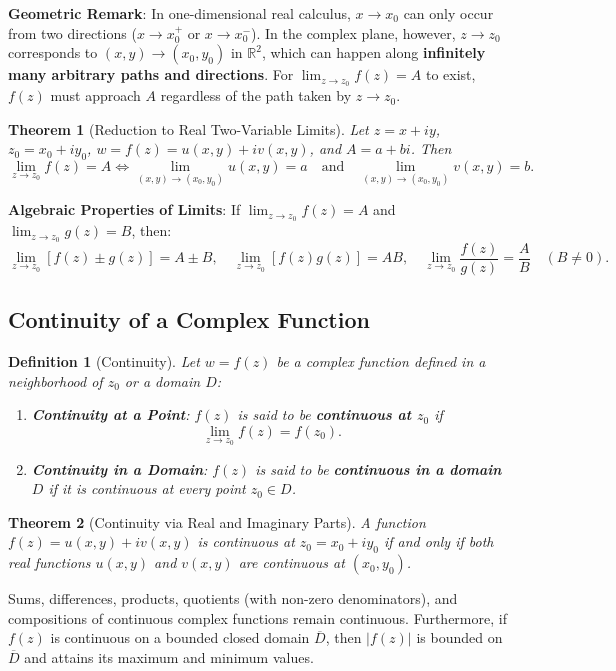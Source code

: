 \documentclass[11pt,a4paper]{article}
\theoremstyle{breakdef}
\newtheorem{definition}{Definition}
\theoremstyle{breakthm}
\newtheorem{theorem}{Theorem}
\begin{document}
\textbf{Geometric Remark}: In one-dimensional real calculus, $x \to x_0$ can only occur from two directions ($x \to x_0^+$ or $x \to x_0^-$). In the complex plane, however, $z \to z_0$ corresponds to $(x, y) \to (x_0, y_0)$ in $\mathbb{R}^2$, which can happen along \textbf{infinitely many arbitrary paths and directions}. For $\lim_{z \to z_0} f(z) = A$ to exist, $f(z)$ must approach $A$ regardless of the path taken by $z \to z_0$.

\begin{theorem}[Reduction to Real Two-Variable Limits]
Let $z = x + iy$, $z_0 = x_0 + iy_0$, $w = f(z) = u(x, y) + iv(x, y)$, and $A = a + bi$. Then
\[
    \lim_{z \to z_0} f(z) = A \iff \lim_{(x,y) \to (x_0,y_0)} u(x, y) = a \quad \text{and} \quad \lim_{(x,y) \to (x_0,y_0)} v(x, y) = b.
\]
\end{theorem}

\textbf{Algebraic Properties of Limits}: If $\lim_{z \to z_0} f(z) = A$ and $\lim_{z \to z_0} g(z) = B$, then:
\[
    \lim_{z \to z_0} [f(z) \pm g(z)] = A \pm B, \quad \lim_{z \to z_0} [f(z)g(z)] = AB, \quad \lim_{z \to z_0} \frac{f(z)}{g(z)} = \frac{A}{B} \quad (B \neq 0).
\]

\subsection{Continuity of a Complex Function}

\begin{definition}[Continuity]
Let $w = f(z)$ be a complex function defined in a neighborhood of $z_0$ or a domain $D$:
\begin{enumerate}
    \item \textbf{Continuity at a Point}: $f(z)$ is said to be \textbf{continuous at $z_0$} if
    \[
        \lim_{z \to z_0} f(z) = f(z_0).
    \]
    \item \textbf{Continuity in a Domain}: $f(z)$ is said to be \textbf{continuous in a domain $D$} if it is continuous at every point $z_0 \in D$.
\end{enumerate}
\end{definition}

\begin{theorem}[Continuity via Real and Imaginary Parts]
A function $f(z) = u(x, y) + iv(x, y)$ is continuous at $z_0 = x_0 + iy_0$ if and only if both real functions $u(x, y)$ and $v(x, y)$ are continuous at $(x_0, y_0)$.
\end{theorem}

Sums, differences, products, quotients (with non-zero denominators), and compositions of continuous complex functions remain continuous. Furthermore, if $f(z)$ is continuous on a bounded closed domain $\overline{D}$, then $|f(z)|$ is bounded on $\overline{D}$ and attains its maximum and minimum values.
\end{document}

